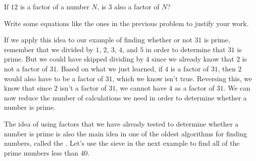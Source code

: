 \documentclass{ximera}
\begin{document}
\begin{question}
If $12$ is a factor of a number $N$, is $3$ also a factor of $N$?
\begin{multipleChoice}
\begin{feedback}
Write some equations like the ones in the previous problem to justify your work.
\end{feedback}
\end{multipleChoice}
\end{question}

If we apply this idea to our example of finding whether or not $31$ is prime, remember that we divided by $1$, $2$, $3$, $4$, and $5$ in order to determine that $31$ is prime. But we could have skipped dividing by $4$ since we already know that $2$ is not a factor of $31$. Based on what we just learned, if $4$ is a factor of $31$, then $2$ would also have to be a factor of $31$, which we know isn't true. Reversing this, we know that since $2$ isn't a factor of $31$, we cannot have $4$ as a factor of $31$. We can now reduce the number of calculations we need in order to determine whether a number is prime.

The idea of using factors that we have already tested to determine whether a number is prime is also the main idea in one of the oldest algorithms for finding numbers, called the . Let's use the sieve in the next example to find all of the prime numbers less than $40$.
\end{document}
